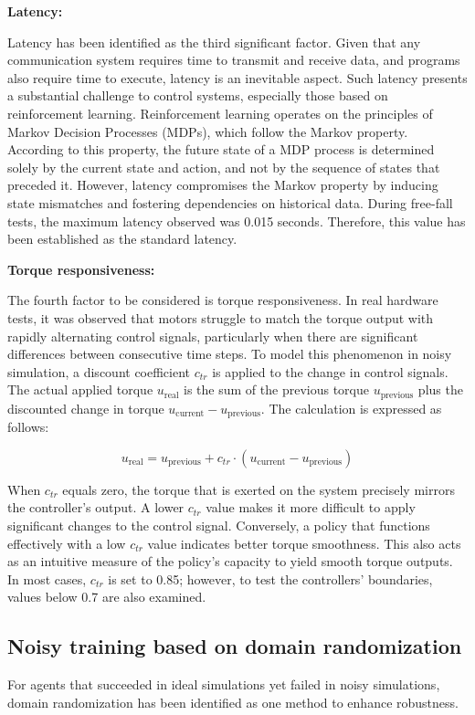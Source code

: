 \textbf{Latency:}

Latency has been identified as the third significant factor. Given that any communication system requires time to transmit and receive data, and programs also require time to execute, latency is an inevitable aspect. Such latency presents a substantial challenge to control systems, especially those based on reinforcement learning. Reinforcement learning operates on the principles of Markov Decision Processes (MDPs), which follow the Markov property. According to this property, the future state of a MDP process is determined solely by the current state and action, and not by the sequence of states that preceded it. However, latency compromises the Markov property by inducing state mismatches and fostering dependencies on historical data. During free-fall tests, the maximum latency observed was 0.015 seconds. Therefore, this value has been established as the standard latency.

\textbf{Torque responsiveness:}

The fourth factor to be considered is torque responsiveness. In real hardware tests, it was observed that motors struggle to match the torque output with rapidly alternating control signals, particularly when there are significant differences between consecutive time steps. To model this phenomenon in noisy simulation, a discount coefficient \( c_{tr} \) is applied to the change in control signals. The actual applied torque \(u_{\text{real}}\) is the sum of the previous torque \(u_{\text{previous}}\) plus the discounted change in torque \(u_{\text{current}} - u_{\text{previous}}\). The calculation is expressed as follows:

\begin{equation}
 u_{\text{real}} = u_{\text{previous}} + c_{tr} \cdot (u_{\text{current}} - u_{\text{previous}})
\end{equation}

When \(c_{tr}\) equals zero, the torque that is exerted on the system precisely mirrors the controller's output. A lower \(c_{tr}\) value makes it more difficult to apply significant changes to the control signal. Conversely, a policy that functions effectively with a low \(c_{tr}\) value indicates better torque smoothness. This also acts as an intuitive measure of the policy's capacity to yield smooth torque outputs. In most cases, \(c_{tr}\) is set to 0.85; however, to test the controllers' boundaries, values below 0.7 are also examined.

\subsection{Noisy training based on domain randomization}
For agents that succeeded in ideal simulations yet failed in noisy simulations, domain randomization has been identified as one method to enhance robustness.

